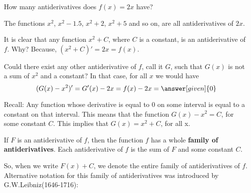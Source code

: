 \documentclass{ximera}
\begin{document}
\begin{question}
  How many antiderivatives does $f(x) = 2x$ have?
  
  \begin{multipleChoice}
  \end{multipleChoice}
  \begin{feedback}
   \begin{image}
\end{image}
    The functions $x^2$, $x^2-1.5$, $x^2+2$, $x^2+5$ and so on, are all
    antiderivatives of $2x$.
    
     It is clear that any function $x^2+C$, where $C$ is a constant, is an antiderivative of $f$. Why?
    Because, $(x^2+C)'=2x=f(x)$.
    
     Could there exist any other antiderivative of $f$, call it $G$, such that $G(x)$ is not a sum of $x^2$ and a constant?
    In that case, for all $x$  we would have
  \[
  (G(x)-x^2)' = G'(x)-2x=f(x)-2x= \answer[given]{0}\\
\]
  \end{feedback}
  Recall: Any function whose derivative is equal to $0$ on some interval is equal to a constant on that interval.
  This means that the function $G(x)-x^2=C$, for some constant $C$. This implies that $G(x)=x^2+C$, for all x.
\end{question}
\begin{theorem}\label{theorem:FOA}

If $F$ is an antiderivative of $f$, then the function $f$ has a whole \textbf{family of antiderivatives}. Each antiderivative of $f$ is the sum of $F$ and some constant $C$.
\end{theorem}
So, when we write $F(x)+C$, we denote the entire family of antiderivatives of $f$.  Alternative notation for this family of antiderivatives was introduced by G.W.Leibniz(1646-1716):
 
\end{document}
